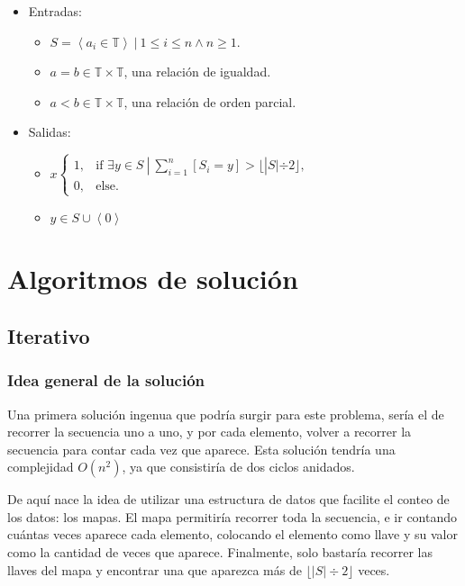 \documentclass[letter]{article}
\begin{document}
\begin{itemize}
    \item Entradas:
    \begin{itemize}
        \item $S = \left< a_i \in \mathbb{T} \right> ~ | ~ 1\le i \le n \land n \geq 1$.
        \item $a=b \in \mathbb{T} \times \mathbb{T}$, una relación de igualdad.
        \item $a<b \in \mathbb{T} \times \mathbb{T}$, una relación de orden parcial.
    \end{itemize}
    \item Salidas:
    \begin{itemize}
        \item $x 
            \begin{cases}
                1, & \text{if } \exists y \in S ~ | ~ \sum_{i=1}^{n}[S_i=y] > \lfloor |S| \div 2 \rfloor,\\
                0, & \text{else}.
            \end{cases}$
        \item $y \in S \cup \left< 0 \right>$
    \end{itemize}
\end{itemize}

\section{Algoritmos de solución} \label{algoritmos}

\subsection{Iterativo} \label{algoritmos:iterativo}

\subsubsection{Idea general de la solución} \label{algoritmos:iterativo:idea}

Una primera solución ingenua que podría surgir para este problema, sería el de recorrer la secuencia uno a uno, y por cada elemento, volver a recorrer la secuencia para contar cada vez que aparece. Esta solución tendría una complejidad $O(n^2)$, ya que consistiría de dos ciclos anidados. \par

De aquí nace la idea de utilizar una estructura de datos que facilite el conteo de los datos: los mapas. El mapa permitiría recorrer toda la secuencia, e ir contando cuántas veces aparece cada elemento, colocando el elemento como llave y su valor como la cantidad de veces que aparece. Finalmente, solo bastaría recorrer las llaves del mapa y encontrar una que aparezca más de $\lfloor |S| \div 2 \rfloor$ veces. \par
\end{document}
